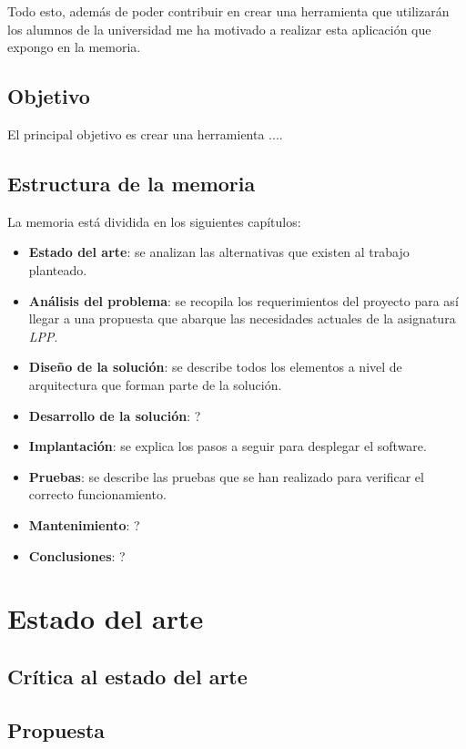 \documentclass[11pt,spanish,listoffigures,listoftables]{tfgetsinf}
\begin{document}
Todo esto, además de poder contribuir en crear una herramienta que utilizarán los alumnos de la universidad me ha motivado a realizar esta aplicación que expongo en la memoria. 

\section{Objetivo}

El principal objetivo es crear una herramienta ....

\section{Estructura de la memoria}

La memoria está dividida en los siguientes capítulos:

\begin{itemize}
	\item \textbf{Estado del arte}: se analizan las alternativas que existen al trabajo planteado.  
	\item \textbf{Análisis del problema}: se recopila los requerimientos del proyecto para así llegar a una propuesta que abarque las necesidades actuales de la asignatura \textit{LPP}.
	\item \textbf{Diseño de la solución}: se describe todos los elementos a nivel de arquitectura que forman parte de la solución.
	\item \textbf{Desarrollo de la solución}: ?
	\item \textbf{Implantación}: se explica los pasos a seguir para desplegar el software.
	\item \textbf{Pruebas}: se describe las pruebas que se han realizado para verificar el correcto funcionamiento.
	\item \textbf{Mantenimiento}: ? 
	\item \textbf{Conclusiones}: ?
\end{itemize}

\chapter{Estado del arte}

\section{Crítica al estado del arte}

\section{Propuesta}
\end{document}

